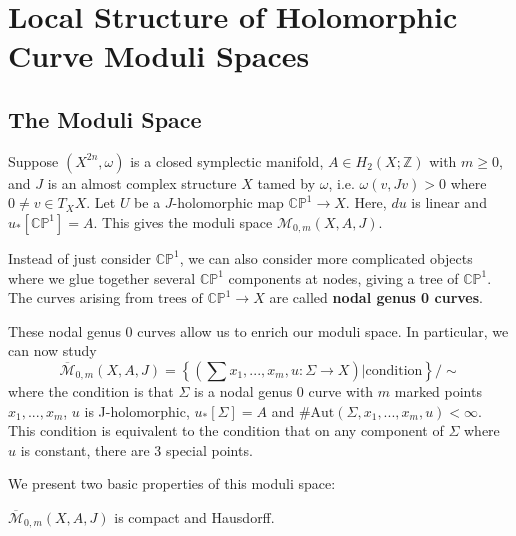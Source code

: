 \chapter{Local Structure of Holomorphic Curve Moduli Spaces}
\label{s1}
\section{The Moduli Space}

Suppose $(X^{2n}, \omega)$ is a closed symplectic manifold, $A\in H_2(X; \mathbb{Z})$ with $m \ge 0$, and $J$ is an almost complex structure $X$ tamed by $\omega$, i.e. $\omega(v,Jv)>0$ where $0\neq v \in T_X X$. Let $U$ be a $J$-holomorphic map $\mathbb{CP}^1 \to X$. Here, $du$ is linear and $u_*[\mathbb{CP}^1]=A$. This gives the moduli space $\mathcal{M}_{0,m}(X, A, J)$.

Instead of just consider $\mathbb{CP}^1$, we can also consider more complicated objects where we glue together several $\mathbb{CP}^1$ components at nodes, giving a tree of $\mathbb{CP}^1$. The curves arising from $\text{trees of }\mathbb{CP}^1 \to X$ are called \textbf{nodal genus 0 curves}.

These nodal genus 0 curves allow us to enrich our moduli space. In particular, we can now study
\[
\overline{\mathcal{M}}_{0,m} (X,A,J) =\left\{ \left(\sum x_1,...,x_m, u: \Sigma \to X\right) | \text{condition} \right\}/\sim
\]
where the condition is that $\Sigma$ is a nodal genus 0 curve with $m$ marked points $x_1,...,x_m$, $u$ is J-holomorphic, $u_*[\Sigma]=A$ and $\# \text{Aut}(\Sigma, x_1,...,x_m,u) < \infty$. This condition is equivalent to the condition that on any component of $\Sigma$ where $u$ is constant, there are 3 special points.

We present two basic properties of this moduli space:

\begin{theorem}

$\overline{\mathcal{M}}_{0,m} (X,A,J)$ is compact and Hausdorff.

\end{theorem}

